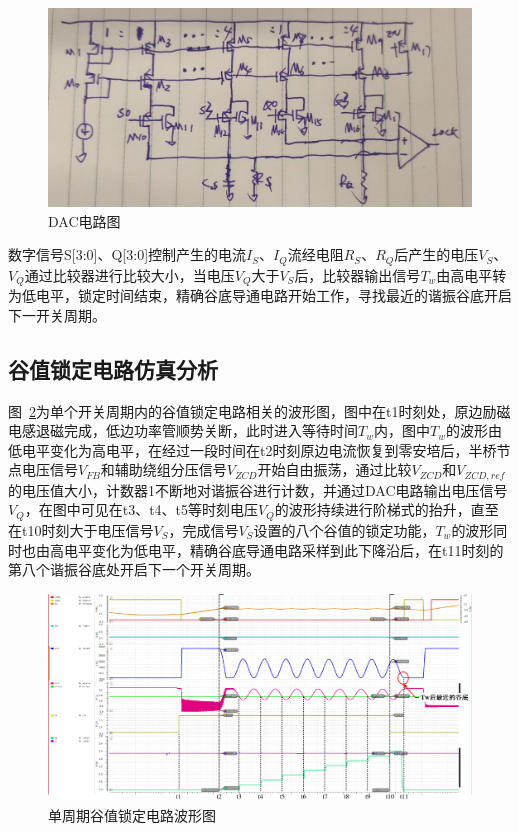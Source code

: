 \begin{figure}[htbp] 
    \centering
    \includegraphics[width=0.6\linewidth]{figures/DAC电路.jpg}
    \caption{DAC电路图}
    \label{fig:DAC电路}
\end{figure} 

数字信号S[3:0]、Q[3:0]控制产生的电流$I_S$、$I_Q$流经电阻$R_S$、$R_Q$后产生的电压$V_S$、$V_Q$通过比较器进行比较大小，当电压$V_Q$大于$V_S$后，比较器输出信号$T_w$由高电平转为低电平，锁定时间结束，精确谷底导通电路开始工作，寻找最近的谐振谷底开启下一开关周期。

\subsection{谷值锁定电路仿真分析}

图~\ref{fig:单周期谷值锁定电路波形图}为单个开关周期内的谷值锁定电路相关的波形图，图中在t1时刻处，原边励磁电感退磁完成，低边功率管顺势关断，此时进入等待时间$T_w$内，图中$T_w$的波形由低电平变化为高电平，在经过一段时间在t2时刻原边电流恢复到零安培后，半桥节点电压信号$V_{FB}$和辅助绕组分压信号$V_{ZCD}$开始自由振荡，通过比较$V_{ZCD}$和$V_{ZCD,ref}$的电压值大小，计数器1不断地对谐振谷进行计数，并通过DAC电路输出电压信号$V_{Q}$，在图中可见在t3、t4、t5等时刻电压$V_{Q}$的波形持续进行阶梯式的抬升，直至在t10时刻大于电压信号$V_{S}$，完成信号$V_{S}$设置的八个谷值的锁定功能，$T_w$的波形同时也由高电平变化为低电平，精确谷底导通电路采样到此下降沿后，在t11时刻的第八个谐振谷底处开启下一个开关周期。

\begin{figure}[htbp] 
    \centering
    \includegraphics[width=0.8\linewidth]{figures/valley_lock.pdf}
    \caption{单周期谷值锁定电路波形图}
    \label{fig:单周期谷值锁定电路波形图}
\end{figure} 

